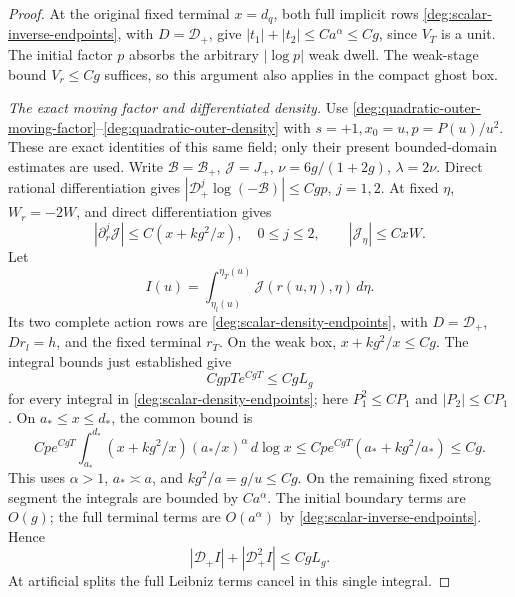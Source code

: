 \begin{proof}
At the original fixed terminal \(x=d_q\), both full implicit rows
\eqref{deg:scalar-inverse-endpoints}, with \(D=\mathcal D_+\),
give \(|t_1|+|t_2|\le Ca^\alpha\le Cg\), since \(V_T\) is a unit.
The initial factor \(p\) absorbs the arbitrary \(|\log p|\)
weak dwell. The weak-stage bound \(V_r\le Cg\) suffices, so this
argument also applies in the compact ghost box.

\smallskip
\noindent\emph{The exact moving factor and differentiated density.}
Use \eqref{deg:quadratic-outer-moving-factor}--\eqref{deg:quadratic-outer-density}
with \(s=+1,x_0=u,p=P(u)/u^2\). These are exact identities of
this same field; only their present bounded-domain estimates are used.
Write \(\mathscr B=\mathscr B_+\), \(\mathscr J=J_+\),
\(\nu=6g/(1+2g)\), \(\lambda=2\nu\). Direct rational differentiation gives
\(|\mathcal D_+^j\log(-\mathscr B)|\le Cgp\), \(j=1,2\).
At fixed \(\eta\), \(W_r=-2W\), and direct differentiation gives
\[
 |\partial_r^j\mathscr J|\le C(x+kg^2/x),\quad 0\le j\le2,
 \qquad |\mathscr J_\eta|\le CxW.
\]
Let
\[
 I(u)=\int_{\eta_l(u)}^{\eta_T(u)}
            \mathscr J(r(u,\eta),\eta)\,d\eta.
\]
Its two complete action rows are \eqref{deg:scalar-density-endpoints},
with \(D=\mathcal D_+\), \(Dr_l=h\), and the fixed terminal \(r_T\).
On the weak box, \(x+kg^2/x\le Cg\).
The integral bounds just established give
\[
 CgpT e^{CgT}\le CgL_g
\]
for every integral in \eqref{deg:scalar-density-endpoints};
here \(P_1^2\le CP_1\) and \(|P_2|\le CP_1\).
On \(a_*\le x\le d_*\), the common bound is
\[
 Cp e^{CgT}\int_{a_*}^{d_*}
 (x+kg^2/x)(a_*/x)^\alpha\,d\log x
 \le Cp e^{CgT}(a_*+kg^2/a_*)\le Cg .
\]
This uses \(\alpha>1\), \(a_*\asymp a\), and
\(kg^2/a=g/u\le Cg\).
On the remaining fixed strong segment the integrals are bounded
by \(Ca^\alpha\).
The initial boundary terms are \(O(g)\); the full terminal terms
are \(O(a^\alpha)\) by
\eqref{deg:scalar-inverse-endpoints}.
Hence
\begin{equation}
 |\mathcal D_+I|+|\mathcal D_+^2I|\le CgL_g.
 \label{deg:positive-compact-density-bound}
\end{equation}
At artificial splits the full Leibniz terms cancel in this single integral.


\end{proof}
